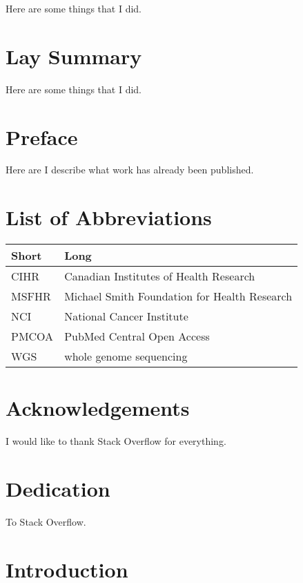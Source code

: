 \documentclass[
  oneside]{ubcthesis}
\begin{document}
Here are some things that I did.

\chapter{Lay Summary}

Here are some things that I did.

\chapter{Preface}

Here are I describe what work has already been published.

{
\setcounter{tocdepth}{2}
\tableofcontents
}
\hypertarget{list-of-abbreviations}{%
\chapter{List of Abbreviations}\label{list-of-abbreviations}}

\begin{longtable}{ll}
\toprule
Short & Long\\
\midrule
CIHR & Canadian Institutes of Health Research\\
MSFHR & Michael Smith Foundation for Health Research\\
NCI & National Cancer Institute\\
PMCOA & PubMed Central Open Access\\
WGS & whole genome sequencing\\
\bottomrule
\end{longtable}

\hypertarget{acknowledgements}{%
\chapter{Acknowledgements}\label{acknowledgements}}

I would like to thank Stack Overflow for everything.

\hypertarget{dedication}{%
\chapter{Dedication}\label{dedication}}

To Stack Overflow.

\mainmatter

\hypertarget{introduction}{%
\chapter{Introduction}\label{introduction}}
\end{document}
